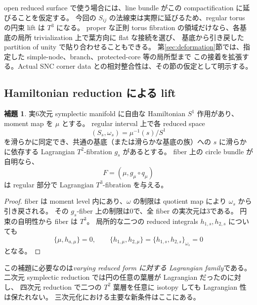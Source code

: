 \documentclass[11pt,a4paper]{article}
\theoremstyle{definition}
\newtheorem{lemma}[theorem]{補題}
\begin{document}
open reduced surface で使う場合には、line bundle がこの compactification に延びることを仮定する。
今回の $S_{ij}$ の法線束は実際に延びるため、regular torus の円束 lift は $T^3$ になる。
proper な正則 torus fibration の領域だけなら、各基底の局所 trivialization 上で葉方向に flat な接続を選び、
基底から引き戻した partition of unity で貼り合わせることもできる。
第\ref{sec:deformation}節では、指定した simple-node、branch、protected-core 等の局所型まで
この接着を拡張する。Actual SNC corner data との相対整合性は、その節の仮定として明示する。

\subsection{Hamiltonian reduction による lift}

\begin{lemma}\label{lem:reduction}
実6次元 symplectic manifold に自由な Hamiltonian $S^1$ 作用があり、moment map を $\mu$ とする。
regular interval 上で各 reduced space
\[
(S_s,\omega_s)=\mu^{-1}(s)/S^1
\]
を滑らかに同定でき、共通の基底（または滑らかな基底の族）への
$s$ に滑らかに依存する Lagrangian $T^2$-fibration $g_s$ があるとする。
fiber 上の circle bundle が自明なら、
\[
F=(\mu,g_\mu\circ q_\mu)
\]
は regular 部分で Lagrangian $T^3$-fibration を与える。
\end{lemma}

\begin{proof}
fiber は moment level 内にあり、$\omega$ の制限は quotient map により $\omega_s$ から引き戻される。
その $g_s$-fiber 上の制限は0で、全 fiber の実次元は3である。
円束の自明性から fiber は $T^3$。
局所的な二つの reduced integrals $h_{1,s},h_{2,s}$ についても
\[
\{\mu,h_{a,\mu}\}=0,\qquad
\{h_{1,\mu},h_{2,\mu}\}=\{h_{1,s},h_{2,s}\}_{\omega_s}=0
\]
となる。
\end{proof}

この補題に必要なのは\emph{varying reduced form に対する Lagrangian family}である。
二次元 symplectic reduction では円の任意の葉層が Lagrangian だったのに対し、
四次元 reduction で二つの $T^2$ 葉層を任意に isotopy しても Lagrangian 性は保たれない。
三次元化における主要な新条件はここにある。
\end{document}
